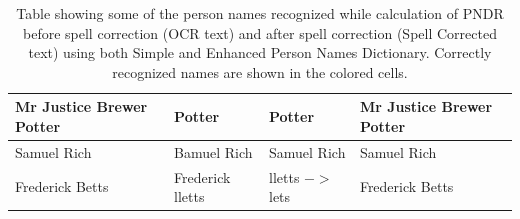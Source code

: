 \documentclass[letterpaper,11pt]{report}
\begin{document}
\begin{table}[h]
\begin{tabular}{|l|p{3cm}|p{3.5cm}|p{3.5cm}|}
Mr Justice Brewer Potter & Potter                         & Potter                    & Mr Justice Brewer Potter \cellcolor[gray]{.8}     \\ \hline
Samuel Rich              & Bamuel Rich                    & Samuel Rich    \cellcolor[gray]{.8}           & Samuel Rich       \cellcolor[gray]{.8}           \\   \hline
Frederick Betts          & Frederick lletts               & lletts $-$$>$ lets            & Frederick Betts\cellcolor[gray]{.8}              \\ \hline
\end{tabular}
\caption{Table showing some of the person names recognized while calculation of PNDR before spell correction (OCR text) and after spell correction (Spell Corrected text) using both Simple and Enhanced Person Names Dictionary. Correctly recognized names are shown in the colored cells. }
\label{table:pndr}
\end{table}
\end{document}
